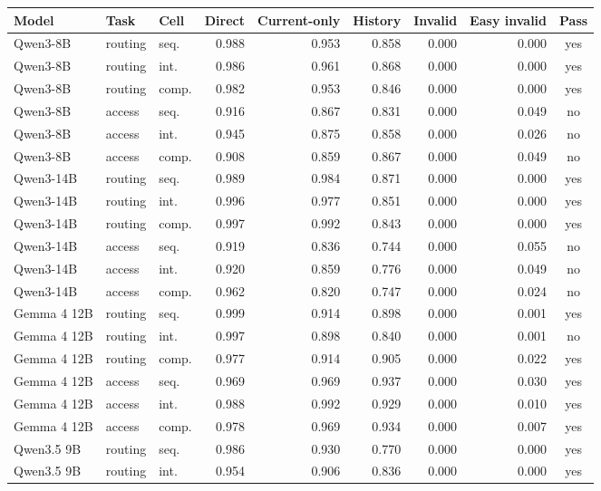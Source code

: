 \begin{table}[t]
\centering
\begin{tabular}{@{}lllrrrrrc@{}}
\toprule
Model & Task & Cell & Direct & Current-only & History & Invalid & Easy invalid & Pass \\
\midrule
Qwen3-8B & routing & seq. & 0.988 & 0.953 & 0.858 & 0.000 & 0.000 & yes \\
Qwen3-8B & routing & int. & 0.986 & 0.961 & 0.868 & 0.000 & 0.000 & yes \\
Qwen3-8B & routing & comp. & 0.982 & 0.953 & 0.846 & 0.000 & 0.000 & yes \\
Qwen3-8B & access & seq. & 0.916 & 0.867 & 0.831 & 0.000 & 0.049 & no \\
Qwen3-8B & access & int. & 0.945 & 0.875 & 0.858 & 0.000 & 0.026 & no \\
Qwen3-8B & access & comp. & 0.908 & 0.859 & 0.867 & 0.000 & 0.049 & no \\
Qwen3-14B & routing & seq. & 0.989 & 0.984 & 0.871 & 0.000 & 0.000 & yes \\
Qwen3-14B & routing & int. & 0.996 & 0.977 & 0.851 & 0.000 & 0.000 & yes \\
Qwen3-14B & routing & comp. & 0.997 & 0.992 & 0.843 & 0.000 & 0.000 & yes \\
Qwen3-14B & access & seq. & 0.919 & 0.836 & 0.744 & 0.000 & 0.055 & no \\
Qwen3-14B & access & int. & 0.920 & 0.859 & 0.776 & 0.000 & 0.049 & no \\
Qwen3-14B & access & comp. & 0.962 & 0.820 & 0.747 & 0.000 & 0.024 & no \\
Gemma 4 12B & routing & seq. & 0.999 & 0.914 & 0.898 & 0.000 & 0.001 & yes \\
Gemma 4 12B & routing & int. & 0.997 & 0.898 & 0.840 & 0.000 & 0.001 & no \\
Gemma 4 12B & routing & comp. & 0.977 & 0.914 & 0.905 & 0.000 & 0.022 & yes \\
Gemma 4 12B & access & seq. & 0.969 & 0.969 & 0.937 & 0.000 & 0.030 & yes \\
Gemma 4 12B & access & int. & 0.988 & 0.992 & 0.929 & 0.000 & 0.010 & yes \\
Gemma 4 12B & access & comp. & 0.978 & 0.969 & 0.934 & 0.000 & 0.007 & yes \\
Qwen3.5 9B & routing & seq. & 0.986 & 0.930 & 0.770 & 0.000 & 0.000 & yes \\
Qwen3.5 9B & routing & int. & 0.954 & 0.906 & 0.836 & 0.000 & 0.000 & yes \\

\end{tabular}
\end{table}
